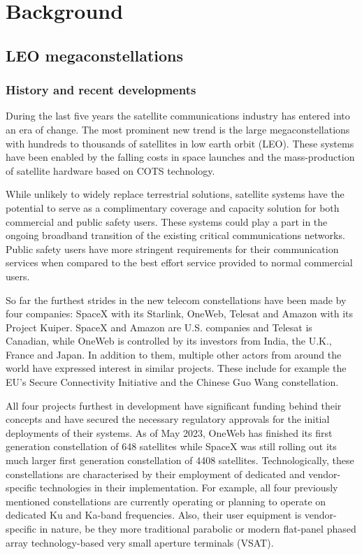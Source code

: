 \documentclass[english, 12pt, a4paper, elec, utf8, a-1b, online]{aaltothesis}
\begin{document}
\clearpage

\section{Background}

\subsection{LEO megaconstellations}
\subsubsection{History and recent developments}
During the last five years the satellite communications industry has entered into an era of change. The most prominent new trend is the large megaconstellations with hundreds to thousands of satellites in low earth orbit (LEO). These systems have been enabled by the falling costs in space launches and the mass-production of satellite hardware based on COTS technology. \cite{portillo2019technical}

While unlikely to widely replace terrestrial solutions, satellite systems have the potential to serve as a complimentary coverage and capacity solution for both commercial and public safety users. These systems could play a part in the ongoing broadband transition of the existing critical communications networks. Public safety users have more stringent requirements for their communication services when compared to the best effort service provided to normal commercial users.

So far the furthest strides in the new telecom constellations have been made by four companies: SpaceX with its Starlink, OneWeb, Telesat and Amazon with its Project Kuiper. SpaceX and Amazon are U.S. companies and Telesat is Canadian, while OneWeb is controlled by its investors from India, the U.K., France and Japan. In addition to them, multiple other actors from around the world have expressed interest in similar projects. These include for example the EU’s Secure Connectivity Initiative and the Chinese Guo Wang constellation.

All four projects furthest in development have significant funding behind their concepts and have secured the necessary regulatory approvals for the initial deployments of their systems. As of May 2023, OneWeb has finished its first generation constellation of 648 satellites while SpaceX was still rolling out its much larger first generation constellation of 4408 satellites. Technologically, these constellations are characterised by their employment of dedicated and vendor-specific technologies in their implementation. For example, all four previously mentioned constellations are currently operating or planning to operate on dedicated Ku and Ka-band frequencies. Also, their user equipment is vendor-specific in nature, be they more traditional parabolic or modern flat-panel phased array technology-based very small aperture terminals (VSAT).
\end{document}
